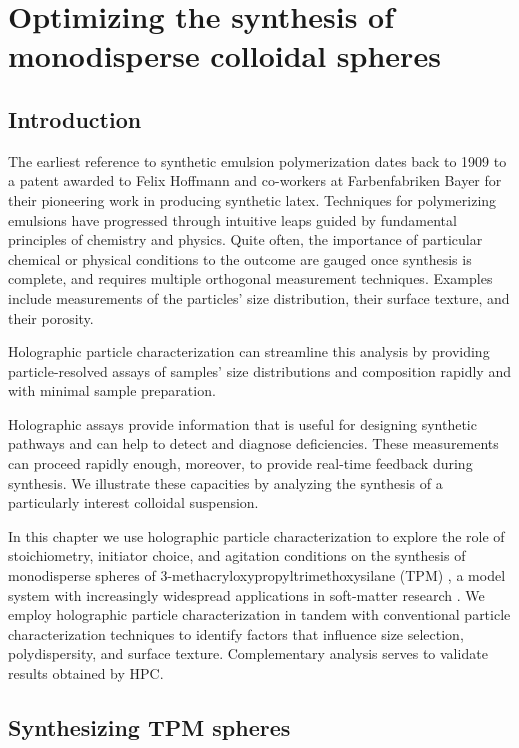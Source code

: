 \chapter{Optimizing the synthesis of monodisperse colloidal spheres}
\label{ch:synthesis}

\section{Introduction}

The earliest reference to synthetic emulsion polymerization dates back to
1909 \cite{bayer1909,finch03} to a patent awarded to Felix Hoffmann and
co-workers at Farbenfabriken Bayer for their pioneering work in producing
synthetic latex.
Techniques for polymerizing emulsions have progressed through
intuitive leaps guided by fundamental principles of chemistry
and physics.  Quite often, the importance of particular chemical
or physical conditions to the outcome are gauged once
synthesis is complete, and requires multiple orthogonal measurement
techniques. Examples include measurements of the particles' size distribution,
their surface texture, and their porosity.

Holographic particle
characterization can streamline this analysis by providing particle-resolved assays
of samples' size distributions and composition rapidly and with
minimal sample preparation.

Holographic assays provide information that is useful for designing synthetic
pathways and can help to detect and diagnose deficiencies. These measurements
can proceed rapidly enough, moreover, to provide real-time feedback during
synthesis. We illustrate these capacities by analyzing the synthesis of a
particularly interest colloidal suspension.

In this chapter we use holographic particle characterization
to explore the role of stoichiometry, initiator choice, and
agitation conditions on the synthesis of monodisperse spheres of
\num{3}-methacryloxypropyltrimethoxysilane (TPM) \cite{vanderwel17},
a model system with increasingly widespread applications
in soft-matter research \cite{sacanna11,liu16,vanderwel18}.
We employ holographic particle characterization
in tandem with conventional particle characterization
techniques to identify factors that 
influence size selection, polydispersity, and surface texture.
Complementary analysis serves to validate results obtained by
HPC.

\section{Synthesizing TPM spheres}

